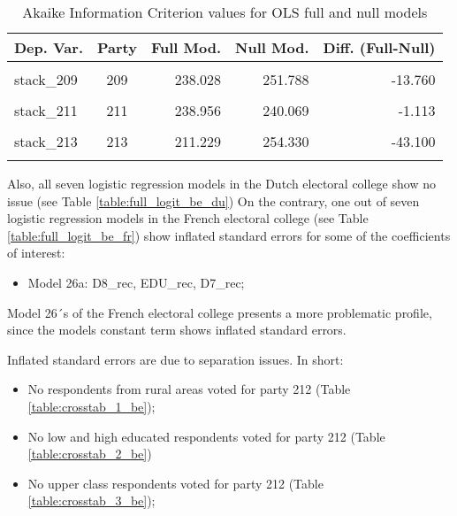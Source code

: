\documentclass[
]{article}
\providecommand{\tightlist}{%
  \setlength{\itemsep}{0pt}\setlength{\parskip}{0pt}}
\begin{document}
\begin{table}[!h]

\caption{\label{tab:unnamed-chunk-11}Akaike Information Criterion values for OLS full and null models 
        \label{table:ols_aic_be_fr}}
\centering
\begin{tabular}[t]{lcrrr}
\toprule
Dep. Var. & Party & Full Mod. & Null Mod. & Diff. (Full-Null)\\
\midrule
\cellcolor{gray!6}{stack\_208} & \cellcolor{gray!6}{208} & \cellcolor{gray!6}{224.742} & \cellcolor{gray!6}{243.907} & \cellcolor{gray!6}{-19.165}\\
stack\_209 & 209 & 238.028 & 251.788 & -13.760\\
\cellcolor{gray!6}{stack\_210} & \cellcolor{gray!6}{210} & \cellcolor{gray!6}{126.949} & \cellcolor{gray!6}{151.975} & \cellcolor{gray!6}{-25.026}\\
stack\_211 & 211 & 238.956 & 240.069 & -1.113\\
\cellcolor{gray!6}{stack\_212} & \cellcolor{gray!6}{212} & \cellcolor{gray!6}{150.043} & \cellcolor{gray!6}{161.937} & \cellcolor{gray!6}{-11.894}\\
\addlinespace
stack\_213 & 213 & 211.229 & 254.330 & -43.100\\
\cellcolor{gray!6}{stack\_214} & \cellcolor{gray!6}{214} & \cellcolor{gray!6}{132.800} & \cellcolor{gray!6}{136.790} & \cellcolor{gray!6}{-3.990}\\
\bottomrule
\end{tabular}
\end{table}

Also, all seven logistic regression models in the Dutch electoral college show no issue (see Table \ref{table:full_logit_be_du})
On the contrary, one out of seven logistic regression models in the French electoral college (see Table \ref{table:full_logit_be_fr}) show inflated standard errors for some of the coefficients of interest:

\begin{itemize}
\tightlist
\item
  Model 26a: D8\_rec, EDU\_rec, D7\_rec;
\end{itemize}

Model 26´s of the French electoral college presents a more problematic profile, since the models constant term shows inflated standard errors.

Inflated standard errors are due to separation issues. In short:

\begin{itemize}
\item
  No respondents from rural areas voted for party 212 (Table \ref{table:crosstab_1_be});
\item
  No low and high educated respondents voted for party 212 (Table \ref{table:crosstab_2_be})
\item
  No upper class respondents voted for party 212 (Table \ref{table:crosstab_3_be});
\end{itemize}
\end{document}
